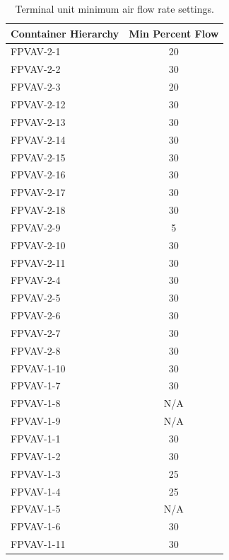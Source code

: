 \begin{table}
\centering
\caption{Terminal unit minimum air flow rate settings.}
\label{tab:MinimumAirFlowRateSettings}
\begin{tabular}{lS}
    \toprule
Conntainer Hierarchy & {Min Percent Flow} \\ \midrule
FPVAV-2-1            & 20                              \\
FPVAV-2-2            & 30                              \\
FPVAV-2-3            & 20                              \\
FPVAV-2-12           & 30                              \\
FPVAV-2-13           & 30                              \\
FPVAV-2-14           & 30                              \\
FPVAV-2-15           & 30                              \\
FPVAV-2-16           & 30                              \\
FPVAV-2-17           & 30                              \\
FPVAV-2-18           & 30                              \\
FPVAV-2-9            & 5                               \\
FPVAV-2-10           & 30                              \\
FPVAV-2-11           & 30                              \\
FPVAV-2-4            & 30                              \\
FPVAV-2-5            & 30                              \\
FPVAV-2-6            & 30                              \\
FPVAV-2-7            & 30                              \\
FPVAV-2-8            & 30                              \\
FPVAV-1-10           & 30                              \\
FPVAV-1-7            & 30                              \\
FPVAV-1-8            & {N/A}                           \\
FPVAV-1-9            & {N/A}                           \\
FPVAV-1-1            & 30                              \\
FPVAV-1-2            & 30                              \\
FPVAV-1-3            & 25                              \\
FPVAV-1-4            & 25                              \\
FPVAV-1-5            & {N/A}                           \\
FPVAV-1-6            & 30                              \\
FPVAV-1-11           & 30               \\ \bottomrule
\end{tabular}
\end{table}




